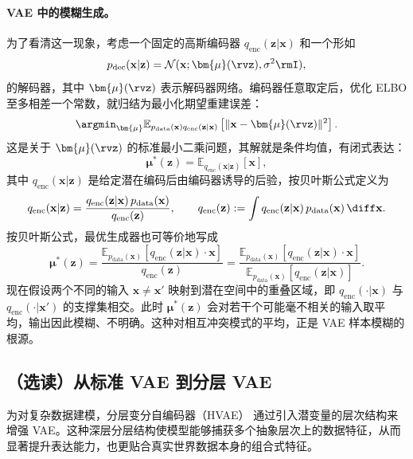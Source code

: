 \paragraph{VAE 中的模糊生成。}
为了看清这一现象，考虑一个固定的高斯编码器 $ q_{\text{enc}}(\mathbf{z}|\mathbf{x}) $ 和一个形如
\[
p_{\text{dec}}(\mathbf{x}|\mathbf{z}) = \mathcal{N}(\mathbf{x}; \bm{\mu}(\rvz), \sigma^2 \rmI),
\]
的解码器，其中 $ \bm{\mu}(\rvz) $ 表示解码器网络。编码器任意取定后，优化 ELBO 至多相差一个常数，就归结为最小化期望重建误差：
\[
\argmin_{\bm{\mu}} \mathbb{E}_{p_{\text{data}}(\mathbf{x})q_{\text{enc}}(\mathbf{z}|\mathbf{x})} \left[ \| \mathbf{x} - \bm{\mu}(\rvz) \|^2 \right].
\]
这是关于 $ \bm{\mu}(\rvz) $ 的标准最小二乘问题，其解就是条件均值，有闭式表达：
\[
\bm{\mu}^*(\mathbf{z}) = \mathbb{E}_{q_{\text{enc}}(\mathbf{x}|\mathbf{z})}[\mathbf{x}],
\]
其中 $ q_{\text{enc}}(\mathbf{x}|\mathbf{z}) $ 是给定潜在编码后由编码器诱导的后验，按贝叶斯公式定义为
\[
q_{\text{enc}}(\mathbf{x}|\mathbf{z})
=
\frac{q_{\text{enc}}(\mathbf{z}|\mathbf{x})\, p_{\text{data}}(\mathbf{x})}{q_{\text{enc}}(\mathbf{z})},
\qquad
q_{\text{enc}}(\mathbf{z})
:=
\int q_{\text{enc}}(\mathbf{z}|\mathbf{x})\, p_{\text{data}}(\mathbf{x})\, \diff \mathbf{x}.
\]
按贝叶斯公式，最优生成器也可等价地写成
\[
\bm{\mu}^*(\mathbf{z})
=
\frac{\mathbb{E}_{p_{\text{data}}(\mathbf{x})}\!\left[q_{\text{enc}}(\mathbf{z}|\mathbf{x}) \cdot \mathbf{x}\right]}
{q_{\text{enc}}(\mathbf{z})}
=
\frac{\mathbb{E}_{p_{\text{data}}(\mathbf{x})}\!\left[q_{\text{enc}}(\mathbf{z}|\mathbf{x}) \cdot \mathbf{x}\right]}
{\mathbb{E}_{p_{\text{data}}(\mathbf{x})}\!\left[q_{\text{enc}}(\mathbf{z}|\mathbf{x})\right]}.
\]
现在假设两个不同的输入 $ \mathbf{x} \neq \mathbf{x}' $ 映射到潜在空间中的重叠区域，即 $ q_{\text{enc}}(\cdot|\mathbf{x}) $ 与 $ q_{\text{enc}}(\cdot|\mathbf{x}') $ 的支撑集相交。此时 $\bm{\mu}^*(\mathbf{z})$ 会对若干个可能毫不相关的输入取平均，输出因此模糊、不明确。这种对相互冲突模式的平均，正是 VAE 样本模糊的根源。


\subsection{（选读）从标准 VAE 到分层 VAE}
为对复杂数据建模，分层变分自编码器（HVAE）
\citep{vahdat2020nvae} 通过引入潜变量的层次结构来增强 VAE。这种深层分层结构使模型能够捕获多个抽象层次上的数据特征，从而显著提升表达能力，也更贴合真实世界数据本身的组合式特征。

